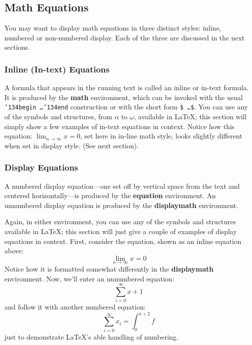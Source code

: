 \subsection{Math Equations}
You may want to display math equations in three distinct styles:
inline, numbered or non-numbered display.  Each of
the three are discussed in the next sections.

\subsubsection{Inline (In-text) Equations}
A formula that appears in the running text is called an
inline or in-text formula.  It is produced by the
\textbf{math} environment, which can be
invoked with the usual \texttt{{\char'134}begin\,\ldots{\char'134}end}
construction or with the short form \texttt{\$\,\ldots\$}. You
can use any of the symbols and structures,
from $\alpha$ to $\omega$, available in
\LaTeX; this section will simply show a
few examples of in-text equations in context. Notice how
this equation:
\begin{math}
  \lim_{n\rightarrow \infty}x=0
\end{math},
set here in in-line math style, looks slightly different when
set in display style.  (See next section).

\subsubsection{Display Equations}
A numbered display equation---one set off by vertical space from the
text and centered horizontally---is produced by the \textbf{equation}
environment. An unnumbered display equation is produced by the
\textbf{displaymath} environment.

Again, in either environment, you can use any of the symbols
and structures available in \LaTeX\@; this section will just
give a couple of examples of display equations in context.
First, consider the equation, shown as an inline equation above:
\begin{equation}
  \lim_{n\rightarrow \infty}x=0
\end{equation}
Notice how it is formatted somewhat differently in
the \textbf{displaymath}
environment.  Now, we'll enter an unnumbered equation:
\begin{displaymath}
  \sum_{i=0}^{\infty} x + 1
\end{displaymath}
and follow it with another numbered equation:
\begin{equation}
  \sum_{i=0}^{\infty}x_i=\int_{0}^{\pi+2} f
\end{equation}
just to demonstrate \LaTeX's able handling of numbering.

